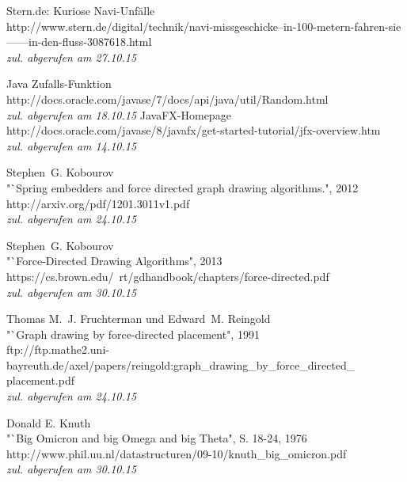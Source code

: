\documentclass[12pt]{article}
\begin{document}
%
%
\begin{thebibliography}{99}
 Stern.de: Kuriose Navi-Unfälle\\
\newblock http://www.stern.de/digital/technik/navi-missgeschicke--in-100-metern-fahren-sie------in-den-fluss-3087618.html \\\emph{zul. abgerufen am 27.10.15}

 Java Zufalls-Funktion\\
\newblock http://docs.oracle.com/javase/7/docs/api/java/util/Random.html \\\emph{zul. abgerufen am 18.10.15}
 JavaFX-Homepage\\
\newblock http://docs.oracle.com/javase/8/javafx/get-started-tutorial/jfx-overview.htm \\\emph{zul. abgerufen am 14.10.15}

 Stephen~G. Kobourov\\
\newblock "`Spring embedders and force directed graph drawing algorithms.", 2012\\
\newblock http://arxiv.org/pdf/1201.3011v1.pdf \\\emph{zul. abgerufen am 24.10.15}

 Stephen~G. Kobourov\\
\newblock "`Force-Directed Drawing Algorithms", 2013\\
\newblock https://cs.brown.edu/~rt/gdhandbook/chapters/force-directed.pdf \\\emph{zul. abgerufen am 30.10.15}

 Thomas M.~J. Fruchterman und Edward~M. Reingold\\
\newblock "`Graph drawing by force-directed placement", 1991\\
\newblock ftp://ftp.mathe2.uni-bayreuth.de/axel/papers/reingold:graph{\_}drawing{\_}by{\_}force{\_}directed{\_}\\placement.pdf \\\emph{zul. abgerufen am 24.10.15}

 Donald E. Knuth\\
\newblock "`Big Omicron and big Omega and big Theta", S. 18-24, 1976\\
\newblock http://www.phil.uu.nl/datastructuren/09-10/knuth{\_}big{\_}omicron.pdf  \\\emph{zul. abgerufen am 30.10.15}

\clearpage


\end{thebibliography}
\end{document}
